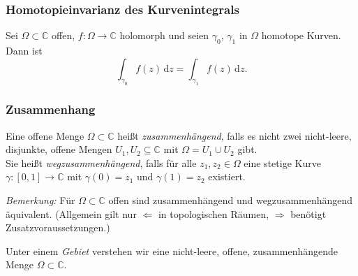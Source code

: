 \documentclass[10pt]{beamer}
\begin{document}
\begin{frame}
	\frametitle{Homotopieinvarianz des Kurvenintegrals}
	\begin{theorem}
		Sei $\Omega \subset \mathbb{C}$ offen, $f:\Omega\to \mathbb{C}$ holomorph und seien $\gamma_0$, $\gamma_1$ in $\Omega$ homotope Kurven.
		Dann ist
		\[
			\int_{\gamma_0} f(z) \,\mathrm{d}z = \int_{\gamma_1} f(z) \,\mathrm{d}z.
		\]
	\end{theorem}
\end{frame}
\begin{frame}
	\frametitle{Zusammenhang}
	\pause
	\begin{definition}
		Eine offene Menge $\Omega \subset \mathbb{C}$ heißt \emph{zusammenhängend}, falls es nicht zwei nicht-leere, disjunkte, offene Mengen $U_1, U_2 \subseteq \mathbb{C}$ mit $\Omega = U_1 \cup U_2$ gibt.\\
		Sie heißt \emph{wegzusammenhängend}, falls für alle $z_1, z_2 \in \Omega$ eine stetige Kurve $\gamma \colon [0, 1] \to \mathbb{C}$ mit $\gamma(0) = z_1$ und $\gamma(1) = z_2$ existiert.
	\end{definition}
	\pause
	\emph{Bemerkung:} Für $\Omega \subset \mathbb{C}$ offen sind zusammenhängend und wegzusammenhängend äquivalent. (Allgemein gilt nur \glqq$\Leftarrow$\grqq{} in topologischen Räumen, \glqq$\Rightarrow$\grqq{} benötigt Zusatzvoraussetzungen.)
	\pause
	\begin{definition}
		Unter einem \emph{Gebiet} verstehen wir eine nicht-leere, offene, zusammenhängende Menge $\Omega \subset \mathbb{C}$.
	\end{definition}
\end{frame}
\end{document}
